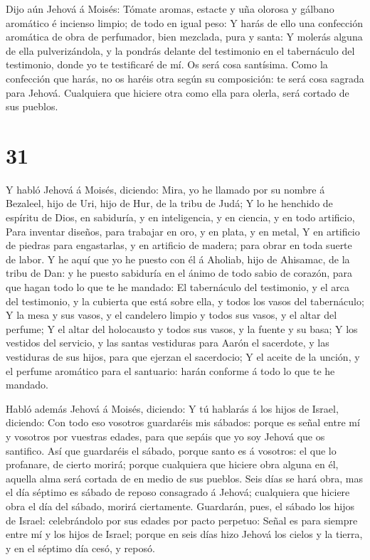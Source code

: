  Dijo aún Jehová á Moisés: Tómate aromas, estacte y uña
olorosa y gálbano aromático é incienso limpio; de todo en igual peso:
 Y harás de ello una confección aromática de obra de
perfumador, bien mezclada, pura y santa:  Y molerás alguna
de ella pulverizándola, y la pondrás delante del testimonio en el
tabernáculo del testimonio, donde yo te testificaré de mí. Os será cosa
santísima.  Como la confección que harás, no os haréis otra
según su composición: te será cosa sagrada para Jehová. 
Cualquiera que hiciere otra como ella para olerla, será cortado de sus
pueblos.

\hypertarget{section-30}{%
\section{31}\label{section-30}}

 Y habló Jehová á Moisés, diciendo:  Mira, yo he
llamado por su nombre á Bezaleel, hijo de Uri, hijo de Hur, de la tribu
de Judá;  Y lo he henchido de espíritu de Dios, en
sabiduría, y en inteligencia, y en ciencia, y en todo artificio,
 Para inventar diseños, para trabajar en oro, y en plata, y
en metal,  Y en artificio de piedras para engastarlas, y en
artificio de madera; para obrar en toda suerte de labor.  Y
he aquí que yo he puesto con él á Aholiab, hijo de Ahisamac, de la tribu
de Dan: y he puesto sabiduría en el ánimo de todo sabio de corazón, para
que hagan todo lo que te he mandado:  El tabernáculo del
testimonio, y el arca del testimonio, y la cubierta que está sobre ella,
y todos los vasos del tabernáculo;  Y la mesa y sus vasos, y
el candelero limpio y todos sus vasos, y el altar del perfume;
 Y el altar del holocausto y todos sus vasos, y la fuente y
su basa;  Y los vestidos del servicio, y las santas
vestiduras para Aarón el sacerdote, y las vestiduras de sus hijos, para
que ejerzan el sacerdocio;  Y el aceite de la unción, y el
perfume aromático para el santuario: harán conforme á todo lo que te he
mandado.

 Habló además Jehová á Moisés, diciendo:  Y tú
hablarás á los hijos de Israel, diciendo: Con todo eso vosotros
guardaréis mis sábados: porque es señal entre mí y vosotros por vuestras
edades, para que sepáis que yo soy Jehová que os santifico.
 Así que guardaréis el sábado, porque santo es á vosotros:
el que lo profanare, de cierto morirá; porque cualquiera que hiciere
obra alguna en él, aquella alma será cortada de en medio de sus pueblos.
 Seis días se hará obra, mas el día séptimo es sábado de
reposo consagrado á Jehová; cualquiera que hiciere obra el día del
sábado, morirá ciertamente.  Guardarán, pues, el sábado los
hijos de Israel: celebrándolo por sus edades por pacto perpetuo:
 Señal es para siempre entre mí y los hijos de Israel;
porque en seis días hizo Jehová los cielos y la tierra, y en el séptimo
día cesó, y reposó.

